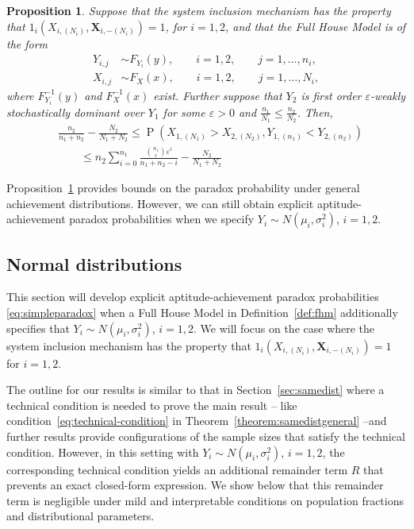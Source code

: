 \documentclass[12pt]{article}
\DeclareMathOperator*{\Prob}{P}
\newtheorem{prop}[theorem]{Proposition}
\begin{document}
\begin{prop} \label{prop:weakstodom}
Suppose that the system inclusion mechanism has the property that $1_{i}\left(X_{i,(N_i)},\textbf{X}_{i,-(N_i)}\right) = 1$, for $i=1,2$, and that the Full House Model is of the form 
\begin{align*}
  Y_{i,j} &\sim F_{Y_i}(y), \qquad i = 1,2, \qquad j = 1,\ldots,n_i, \\
  X_{i,j} &\sim F_X(x), \qquad i = 1,2, \qquad j = 1,\ldots,N_i, 
\end{align*}
where $F_{Y_i}^{-1}(y)$ and $F_X^{-1}(x)$ exist. Further suppose that $Y_2$ is first order $\varepsilon$-weakly stochastically dominant over $Y_1$ for some $\varepsilon > 0$ and $\frac{n_1}{N_1} \leq \frac{n_2}{N_2}$. Then,
\begin{equation} \label{eq:paradox2}
\begin{split}
  &\frac{n_2}{n_1 + n_2} - \frac{N_2}{N_1 + N_2} \leq \Prob\left(X_{1,(N_1)} > X_{2,(N_2)}, Y_{1,(n_1)} < Y_{2,(n_2)}\right) \\
  &\qquad\leq n_2\sum_{i=0}^{n_1} \frac{{n_1 \choose i}\varepsilon^i}{n_1+n_2-i}- \frac{N_2}{N_1 + N_2}
\end{split}
\end{equation}
\end{prop}

Proposition~\ref{prop:weakstodom} provides bounds on the paradox probability under general achievement distributions. However, we can still obtain explicit aptitude-achievement paradox probabilities when we specify $Y_i \sim N(\mu_i,\sigma_i^2)$, $i = 1,2$.


\subsection{Normal distributions}
\label{subsec:normal}

This section will develop explicit aptitude-achievement paradox probabilities \eqref{eq:simpleparadox} when a Full House Model in Definition~\ref{def:fhm} additionally specifies that $Y_i \sim N(\mu_i,\sigma_i^2)$, $i = 1,2$. We will focus on the case where the system inclusion mechanism has the property that $1_i(X_{i,(N_i)}, \textbf{X}_{i,-(N_i)}) = 1$ for $i = 1,2$. 

The outline for our results is similar to that in Section~\ref{sec:samedist} where a technical condition is needed to prove the main result -- like condition~\eqref{eq:technical-condition} in Theorem~\ref{theorem:samedistgeneral} --and further results provide configurations of the sample sizes that satisfy the technical condition. However, in this setting with $Y_i \sim N(\mu_i,\sigma_i^2)$, $i = 1,2$, the corresponding technical condition yields an additional remainder term $R$ that prevents an exact closed-form expression. We show below that this remainder term is negligible under mild and interpretable conditions on population fractions and distributional parameters.
\end{document}
